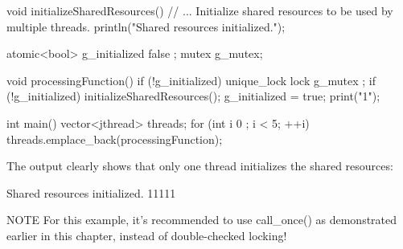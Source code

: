\begin{cpp}
void initializeSharedResources()
{
    // ... Initialize shared resources to be used by multiple threads.
    println("Shared resources initialized.");
}

atomic<bool> g_initialized { false };
mutex g_mutex;

void processingFunction()
{
    if (!g_initialized) {
        unique_lock lock { g_mutex };
        if (!g_initialized) {
            initializeSharedResources();
            g_initialized = true;
        }
    }
    print("1");
}

int main()
{
    vector<jthread> threads;
    for (int i { 0 }; i < 5; ++i) {
        threads.emplace_back(processingFunction);
    }
}
\end{cpp}

The output clearly shows that only one thread initializes the shared resources:

\begin{shell}
Shared resources initialized.
11111
\end{shell}


\begin{myNotic}{NOTE}
For this example, it’s recommended to use call\_once() as demonstrated earlier in this chapter, instead of double-checked locking!
\end{myNotic}





